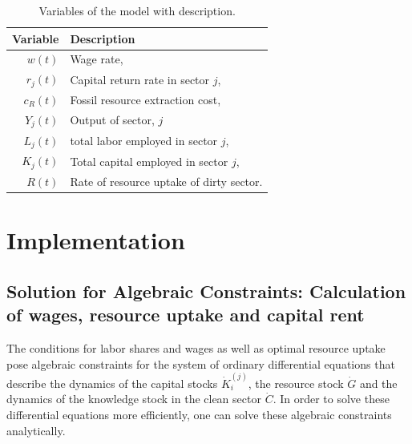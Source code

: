 \begin{table}[t]
	\centering
	\begin{tabular}{r|l}
		Variable & Description \\\hline
		$w(t)$   & Wage rate, \\
		$r_j(t)$ & Capital return rate in sector $j$, \\
		$c_R(t)$ & Fossil resource extraction cost, \\
		$Y_j(t)$ & Output of sector, $j$ \\
		$L_j(t)$ & total labor employed in sector $j$, \\
		$K_j(t)$ & Total capital employed in sector $j$, \\
		$R(t)$ & Rate of resource uptake of dirty sector. \\
	\end{tabular}
	\caption{Variables of the model with description.}
	\label{tab:derived_variables}
 \end{table}

 
\section{Implementation} 



\subsection{Solution for Algebraic Constraints: Calculation of wages, resource uptake and capital rent}
\label{sec:algebraic_constraints}

The conditions for labor shares and wages as well as optimal resource uptake pose algebraic constraints for the system of ordinary differential equations that describe the dynamics of the capital stocks $\dot{K}_i^{(j)}$, the resource stock $\dot{G}$ and the dynamics of the knowledge stock in the clean sector $\dot{C}$. In order to solve these differential equations more efficiently, one can solve these algebraic constraints analytically.

